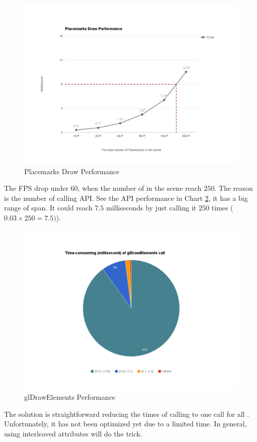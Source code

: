 \begin{figure}[H]
	\caption{Placemarks Draw Performance}
	\label{fig:placemarks-draw-performance}
	\centering
	\includegraphics[width=\textwidth, keepaspectratio]{Figures/placemarks-draw-performance.png}
	\decoRule
\end{figure}

The FPS drop under $60$, when the number of  in the scene reach $250$. The reason is the number of calling  API. See the API performance in Chart \ref{fig:glDrawElements-performance}, it has a big range of span. It could reach $7.5$ milliseconds by just calling it $250$ times ($0.03 \times 250 = 7.5)$).

\begin{figure}[H]
	\caption{glDrawElements Performance}
	\label{fig:glDrawElements-performance}
	\centering
	\includegraphics[width=\textwidth, keepaspectratio]{Figures/glDrawElements-performance.png}
	\decoRule
\end{figure}

The solution is straightforward reducing the times of calling  to one call for all . Unfortunately, it has not been optimized yet due to a limited time. In general, using interleaved attributes will do the trick.


